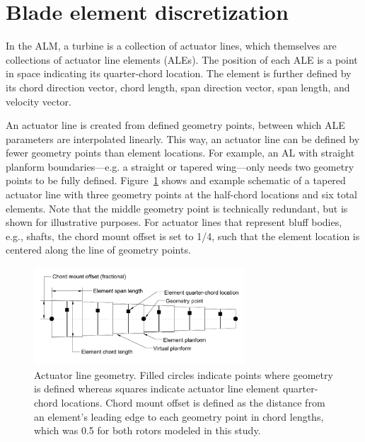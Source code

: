 \documentclass[times]{weauth}
\begin{document}
\section{Blade element discretization}

In the ALM, a turbine is a collection of actuator lines, which themselves are
collections of actuator line elements (ALEs). The position of each ALE is a
point in space indicating its quarter-chord location. The element is further
defined by its chord direction vector, chord length, span direction vector, span
length, and velocity vector.

An actuator line is created from defined geometry points, between which ALE
parameters are interpolated linearly. This way, an actuator line can be defined
by fewer geometry points than element locations. For example, an AL with
straight planform boundaries---e.g. a straight or tapered wing---only needs two
geometry points to be fully defined. Figure~\ref{fig:AL-geom} shows and example
schematic of a tapered actuator line with three geometry points at the
half-chord locations and six total elements. Note that the middle geometry point
is technically redundant, but is shown for illustrative purposes. For actuator
lines that represent bluff bodies, e.g., shafts, the chord mount offset is set
to 1/4, such that the element location is centered along the line of geometry
points.

\begin{figure}
    \centering

    \includegraphics[width=0.7\textwidth]{thesis_alm-geometry}

    \caption{Actuator line geometry. Filled circles indicate points where
    geometry is defined whereas squares indicate actuator line element
    quarter-chord locations. Chord mount offset is defined as the distance from
    an element's leading edge to each geometry point in chord lengths, which was
    0.5 for both rotors modeled in this study.}

    \label{fig:AL-geom}
\end{figure}
\end{document}
